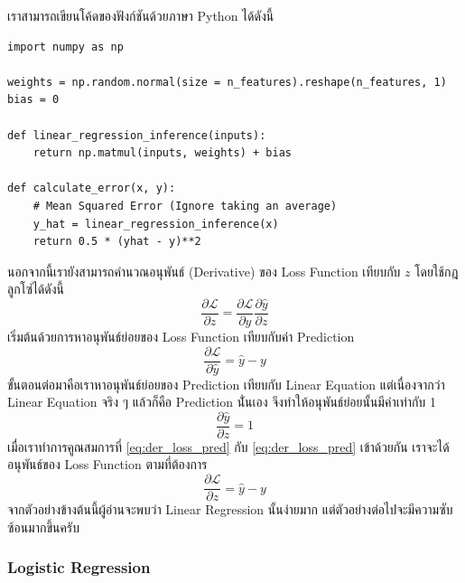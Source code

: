 เราสามารถเขียนโค้ดของฟังก์ชันด้วยภาษา Python ได้ดังนี้

\begin{lstlisting}[style=MyPython]
import numpy as np

weights = np.random.normal(size = n_features).reshape(n_features, 1)
bias = 0

def linear_regression_inference(inputs):
    return np.matmul(inputs, weights) + bias   

def calculate_error(x, y):
    # Mean Squared Error (Ignore taking an average)
    y_hat = linear_regression_inference(x)
    return 0.5 * (yhat - y)**2 
\end{lstlisting}

\vspace{1em}

นอกจากนี้เรายังสามารถคำนวณอนุพันธ์ (Derivative) ของ Loss Function เทียบกับ $z$ โดยใช้กฎลูกโซ่ได้ดังนี้
%
\begin{equation}\label{eq:loss_chain_rule}
    \frac{\partial \mathcal{L}}{\partial z} =
    \frac{\partial \mathcal{L}}{\partial \hat{y}} \frac{\partial \hat{y}}{\partial z}
\end{equation}
%
\noindent เริ่มต้นด้วยการหาอนุพันธ์ย่อยของ Loss Function เทียบกับค่า Prediction
%
\begin{equation}\label{eq:der_loss_pred}
    \frac{\partial \mathcal{L}}{\partial \hat{y}} = \hat{y} - y
\end{equation}
%
\noindent ขั้นตอนต่อมาคือเราหาอนุพันธ์ย่อยของ Prediction เทียบกับ Linear Equation แต่เนื่องจากว่า Linear Equation จริง ๆ แล้วก็คือ Prediction นั่่นเอง จึงทำให้อนุพันธ์ย่อยนั้นมีค่าเท่ากับ 1
%
\begin{equation}\label{eq:der_pred_lin_eq}
    \frac{\partial \hat{y}}{\partial z} = 1
\end{equation}
%
\noindent เมื่อเราทำการคูณสมการที่ \eqref{eq:der_loss_pred} กับ \eqref{eq:der_loss_pred} เข้าด้วยกัน เราจะได้อนุพันธ์ของ Loss
Function ตามที่ต้องการ
%
\begin{equation}\label{eq:der_loss_lin_eq}
    \frac{\partial \mathcal{L}}{\partial z} = \hat{y} - y
\end{equation}
%
\noindent จากตัวอย่างข้างต้นนี้ผู้อ่านจะพบว่า Linear Regression นั้นง่ายมาก แต่ตัวอย่างต่อไปจะมีความซับซ้อนมากขึ้นครับ

\subsubsection{Logistic Regression}

